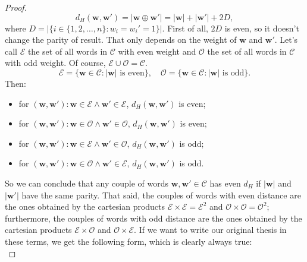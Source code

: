 \begin{lemma}
\begin{proof}
        \begin{equation*}
            d_H(\mathbf{w}, \mathbf{w}') = |\mathbf{w} \oplus \mathbf{w}'| = |\textbf{w}| + |\textbf{w}'| + 2D,
        \end{equation*}
        where $D=|\{i \in \{1,2,\ldots,n\}:w_i=w_i'=1\}|$.
        First of all, $2D$ is even, so it doesn't change the parity of result. That only depends on the weight of $\mathbf{w}$ and $\mathbf{w}'$.
        Let's call $\mathcal{E}$ the set of all words in $\mathcal{C}$ with even weight and $\mathcal{O}$ the set of all words in $\mathcal{C}$ with odd weight. Of course, $\mathcal{E} \cup \mathcal{O} = \mathcal{C}$.
        \begin{equation*}
            \mathcal{E} = \{\mathbf{w} \in \mathcal{C} : |\mathbf{w}|\text{ is even}\}, \quad \mathcal{O} = \{\mathbf{w} \in \mathcal{C} : |\mathbf{w}|\text{ is odd}\}.
        \end{equation*}
        Then:
        \begin{itemize}
            \item for $(\mathbf{w}, \mathbf{w}'): \mathbf{w} \in \mathcal{E} \land \mathbf{w}' \in \mathcal{E}$, $d_H(\mathbf{w}, \mathbf{w}')$ is even;
            \item for $(\mathbf{w}, \mathbf{w}'): \mathbf{w} \in \mathcal{O} \land \mathbf{w}' \in \mathcal{O}$, $d_H(\mathbf{w}, \mathbf{w}')$ is even;
            \item for $(\mathbf{w}, \mathbf{w}'): \mathbf{w} \in \mathcal{E} \land \mathbf{w}' \in \mathcal{O}$, $d_H(\mathbf{w}, \mathbf{w}')$ is odd;
            \item for $(\mathbf{w}, \mathbf{w}'): \mathbf{w} \in \mathcal{O} \land \mathbf{w}' \in \mathcal{E}$, $d_H(\mathbf{w}, \mathbf{w}')$ is odd.
        \end{itemize}
        So we can conclude that any couple of words $\mathbf{w}, \mathbf{w}' \in \mathcal{C}$ has even $d_H$ if $|\mathbf{w}|$ and $|\mathbf{w}'|$ have the same parity.
        That said, the couples of words with even distance are the ones obtained by the cartesian products $\mathcal{E} \times \mathcal{E}=\mathcal{E}^2$ and $\mathcal{O} \times \mathcal{O}=\mathcal{O}^2$; furthermore, the couples of words with odd distance are the ones obtained by the cartesian products $\mathcal{E} \times \mathcal{O}$ and $\mathcal{O} \times \mathcal{E}$.
        If we want to write our original thesis in these terms, we get the following form, which is clearly always true:
        \begin{equation*}

\end{equation*}
\end{proof}
\end{lemma}
